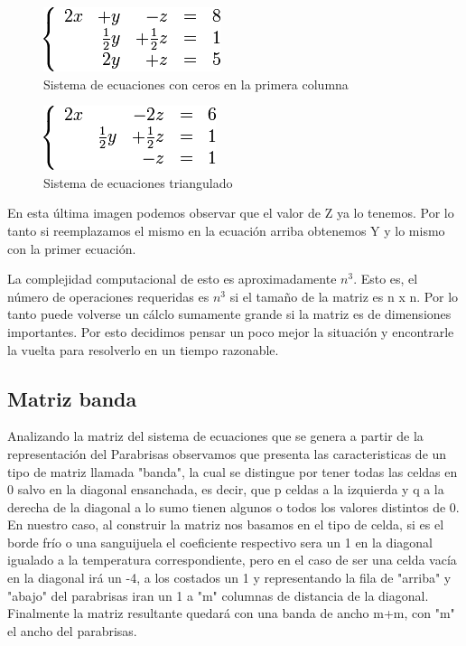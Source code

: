 \begin{figure}[htb]
\begin{center}
\includegraphics[scale=0.70]{imagenes/ejemplo_gaus_2.png} 
\caption{Sistema de ecuaciones con ceros en la primera columna} 
\end{center}
\end{figure}

\begin{figure}[htb]
\begin{center}
\includegraphics[scale=0.70]{imagenes/ejemplo_gaus_3.png} 
\caption{Sistema de ecuaciones triangulado} 
\end{center}
\end{figure}
\newpage
En esta última imagen podemos observar que el valor de Z ya lo tenemos. Por lo tanto si reemplazamos el mismo en la ecuación arriba obtenemos Y y lo mismo con la primer ecuación.

La complejidad computacional de esto es aproximadamente $n^3$. Esto es, el número de operaciones requeridas es $n^3$ si el tamaño de la matriz es n x n. Por lo tanto puede volverse un cálclo sumamente grande si la matriz es de dimensiones importantes. Por esto decidimos pensar un poco mejor la situación y encontrarle la vuelta para resolverlo en un tiempo razonable. 

\subsection{Matriz banda}

Analizando la matriz del sistema de ecuaciones que se genera a partir de la representación del Parabrisas observamos que presenta las caracteristicas de un tipo de matriz llamada "banda", la cual se distingue por tener todas las celdas en 0 salvo en la diagonal ensanchada, es decir, que p celdas a la izquierda y q a la derecha de la diagonal a lo sumo tienen algunos o todos los valores distintos de 0. En nuestro caso, al construir la matriz nos basamos en el tipo de celda, si es el borde frío o una sanguijuela el coeficiente respectivo sera un 1 en la diagonal igualado a la temperatura correspondiente, pero en el caso de ser una celda vacía en la diagonal irá un -4, a los costados un 1 y representando la fila de "arriba" y "abajo" del parabrisas iran un 1 a "m" columnas de distancia de la diagonal. Finalmente la matriz resultante quedará con una banda de ancho m+m, con "m" el ancho del parabrisas.

